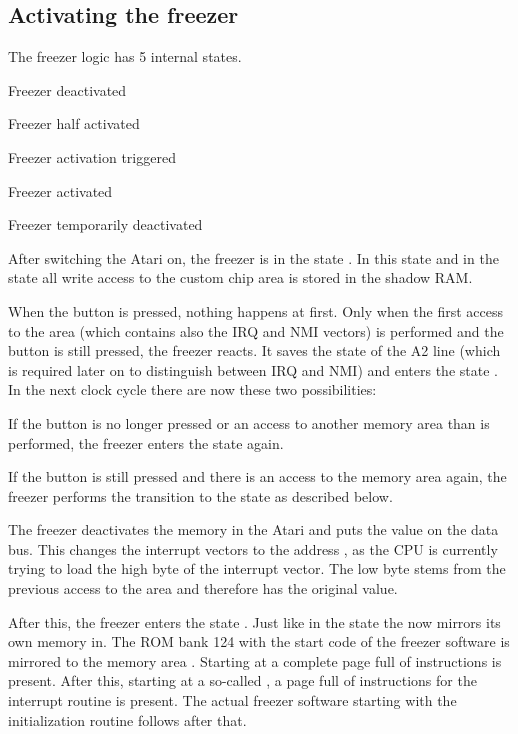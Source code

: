 \subsection{Activating the freezer}

The freezer logic has 5 internal states.

\begin{itemize*}
\item Freezer deactivated
\item Freezer half activated
\item Freezer activation triggered
\item Freezer activated
\item Freezer temporarily deactivated
\end{itemize*}

After switching the Atari on, the freezer is in the state .
In this state and in the state  all write access to the
custom chip area is stored in the shadow RAM.

When the  button is pressed, nothing happens at first. Only when the
first access to the area  (which contains also the IRQ and NMI
vectors) is performed and the  button is still pressed, the freezer
reacts. It saves the state of the A2 line (which is required later on to
distinguish between IRQ and NMI) and enters the state . In
the next clock cycle there are now these two possibilities:

\begin{itemize*}
\item If the  button is no longer pressed or an access to
another memory area than  is performed, the freezer enters
the  state again.
\item If the  button is still pressed and there is an access to
the memory area  again, the freezer performs the transition to
the state  as described below.
\end{itemize*}

The freezer deactivates the memory in the Atari and puts the value 
on the data bus. This changes the interrupt vectors to the address ,
as the CPU is currently trying to load the high byte of the interrupt vector.
The low byte stems from the previous access to the 
area and therefore has the original value.

After this, the freezer enters the state .
Just like in the state  the \frz now mirrors its own memory in.
The ROM bank 124 with the start code of the freezer software is mirrored to the
memory area . Starting at  a complete page full of
 instructions is present. After this, \ie starting at  a
so-called , \ie a page full of  instructions for the
 interrupt routine is present. The actual freezer software starting
with the initialization routine follows after that.

